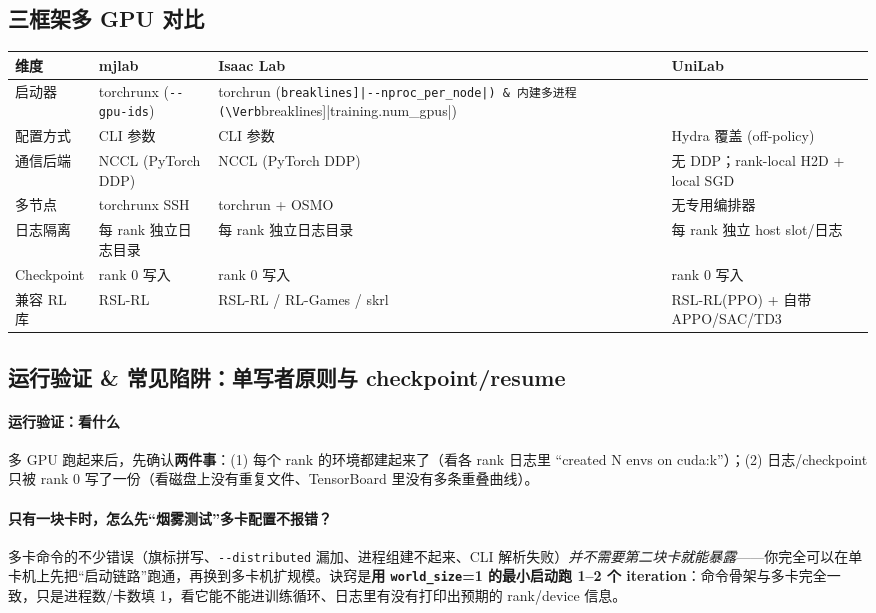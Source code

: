 \subsection{三框架多 GPU 对比}
\label{sec:rlmc-ls-multigpu-compare}

\begin{center}
\small
\begin{tabular}{@{}p{2.4cm}p{3.4cm}p{3.6cm}p{2.4cm}@{}}
\toprule
维度 & mjlab & Isaac Lab & UniLab \\
\midrule
启动器 & torchrunx (\verb|--gpu-ids|) & torchrun (\Verb[breaklines]|--nproc_per_node|) & 内建多进程 (\Verb[breaklines]|training.num_gpus|) \\
配置方式 & CLI 参数 & CLI 参数 \Verb[breaklines]|+ --distributed| & Hydra 覆盖 (off-policy) \\
通信后端 & NCCL (PyTorch DDP) & NCCL (PyTorch DDP) & 无 DDP；rank-local H2D + local SGD \\
多节点 & torchrunx SSH & torchrun + OSMO & 无专用编排器 \\
日志隔离 & 每 rank 独立日志目录 & 每 rank 独立日志目录 & 每 rank 独立 host slot/日志 \\
Checkpoint & rank 0 写入 & rank 0 写入 & rank 0 写入 \\
兼容 RL 库 & RSL-RL & RSL-RL / RL-Games / skrl & RSL-RL(PPO) + 自带 APPO/SAC/TD3 \\
\bottomrule
\end{tabular}
\end{center}

\subsection{运行验证 \& 常见陷阱：单写者原则与 checkpoint/resume}
\label{sec:rlmc-ls-single-writer}

\paragraph{\texorpdfstring{ 运行验证：看什么}{4 运行验证：看什么}}多 GPU 跑起来后，先确认\textbf{两件事}：(1) 每个 rank 的环境都建起来了（看各 rank 日志里 “created N envs on cuda:k”）；(2) 日志/checkpoint 只被 rank 0 写了一份（看磁盘上没有重复文件、TensorBoard 里没有多条重叠曲线）。

\paragraph{\texorpdfstring{只有一块卡时，怎么先“烟雾测试”多卡配置不报错？}{只有一块卡时，怎么先烟雾测试多卡配置}}多卡命令的不少错误（旗标拼写、\verb|--distributed| 漏加、进程组建不起来、CLI 解析失败）\emph{并不需要第二块卡就能暴露}——你完全可以在单卡机上先把“启动链路”跑通，再换到多卡机扩规模。诀窍是\textbf{用 \texttt{world\_size}=1 的最小启动跑 1--2 个 iteration}：命令骨架与多卡完全一致，只是进程数/卡数填 1，看它能不能进训练循环、日志里有没有打印出预期的 rank/device 信息。


